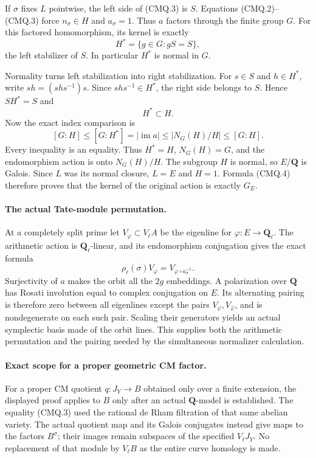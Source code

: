 If $\sigma$ fixes $L$ pointwise, the left side of
(CMQ.3) is $S$. Equations (CMQ.2)--(CMQ.3) force
$n_\sigma\in H$ and $a_\sigma=1$. Thus $a$ factors
through the finite group $G$. For this factored
homomorphism, its kernel is exactly
\[
                 H^*=\{g\in G:gS=S\},                    \tag{CMQ.4}
\]
the left stabilizer of $S$. In particular $H^*$ is
normal in $G$.

Normality turns left stabilization into right
stabilization. For $s\in S$ and $h\in H^*$, write
$sh=(shs^{-1})s$. Since $shs^{-1}\in H^*$, the
right side belongs to $S$. Hence $SH^*=S$ and
\[
                                H^*\subset H.              \tag{CMQ.5}
\]
Now the exact index comparison is
\[
 [G:H]\leq [G:H^*]=|\operatorname{im}a|
       \leq|N_G(H)/H|\leq[G:H].                            \tag{CMQ.6}
\]
Every inequality is an equality. Thus $H^*=H$,
$N_G(H)=G$, and the endomorphism action is onto
$N_G(H)/H$. The subgroup $H$ is normal, so $E/\mathbf Q$
is Galois. Since $L$ was its normal closure, $L=E$
and $H=1$. Formula (CMQ.4) therefore proves that the
kernel of the original action is exactly $G_E$.

\paragraph{The actual Tate-module permutation.}
At a completely split prime let
$V_\varphi\subset V_\ell A$ be the eigenline for
$\varphi:E\to\mathbf Q_\ell$. The arithmetic action
is $\mathbf Q_\ell$-linear, and its endomorphism
conjugation gives the exact formula
\[
 \rho_\ell(\sigma)V_\varphi
                    =V_{\varphi\circ a_\sigma^{-1}}.       \tag{CMQ.7}
\]
Surjectivity of $a$ makes the orbit all the
$2g$ embeddings. A polarization over $\mathbf Q$
has Rosati involution equal to complex conjugation
on $E$. Its alternating pairing is therefore zero
between all eigenlines except the pairs
$V_\varphi,V_{\bar\varphi}$, and is nondegenerate
on each such pair. Scaling their generators yields
an actual symplectic basis made of the orbit lines.
This supplies both the arithmetic permutation and
the pairing needed by the simultaneous normalizer
calculation.

\paragraph{Exact scope for a proper geometric CM factor.}
For a proper CM quotient $q:J_Y\to B$ obtained only
over a finite extension, the displayed proof applies
to $B$ only after an actual $\mathbf Q$-model is
established. The equality (CMQ.3) used the rational
de Rham filtration of that same abelian variety.
The actual quotient map and its Galois conjugates
instead give maps to the factors $B^\sigma$;
their images remain subspaces of the specified
$V_\ell J_Y$. No replacement of that module by
$V_\ell B$ as the entire curve homology is made.
